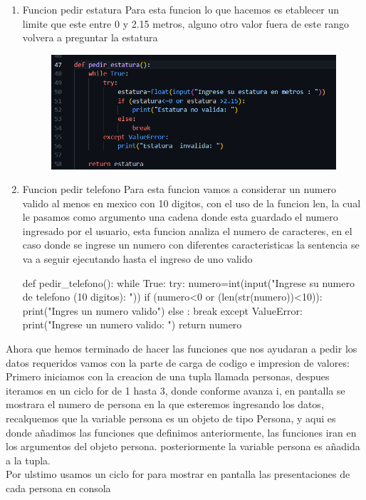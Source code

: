 \documentclass[12pt]{article}
\begin{document}
\begin{enumerate}
\item{Funcion pedir estatura} Para esta funcion lo que hacemos es etablecer un limite que este entre 0 y 2.15 metros, alguno otro valor fuera de este rango volvera a preguntar la estatura

\begin{figure}[H]
		\begin{center}
 			\includegraphics[width = .8\textwidth]{04.png}
 			
		\end{center} 
\end{figure}

\item{Funcion pedir telefono}
Para esta funcion vamos a considerar un numero valido al menos en mexico con 10 digitos, con el uso de la funcion len, la cual  le pasamos como argumento una cadena donde esta guardado el numero ingresado por el usuario, esta funcion analiza el numero de caracteres, en el caso donde se ingrese un numero con diferentes caracteristicas la sentencia se va a seguir ejecutando hasta el ingreso de uno valido


\begin{python}[caption=Funcion para pedir un numero de telefono ,label=python_example]
def pedir_telefono():
    while True:
        try:
            numero=int(input("Ingrese su numero de telefono (10 digitos): \n"))
            if (numero<0 or (len(str(numero))<10)):
                print("Ingres un numero valido")
            else :
                break
        except ValueError:
            print("Ingrese un numero valido: ")
    return numero

\end{python}



\end{enumerate}

Ahora que hemos terminado de hacer las funciones que nos ayudaran a 
pedir los datos requeridos vamos con la parte de carga de codigo e impresion de valores: \\
Primero iniciamos con la creacion de una tupla llamada personas, despues iteramos en un ciclo for de 1 hasta 3, donde conforme avanza i, en pantalla se mostrara el numero de persona en la que esteremos ingresando los datos, recalquemos que la variable persona es un objeto de tipo Persona, y aqui es donde añadimos las funciones que definimos anteriormente, las funciones iran en los argumentos del objeto persona. posteriormente la variable persona es añadida a la tupla.\\
Por ulstimo usamos un ciclo for para mostrar en pantalla las presentaciones de cada persona en consola
\end{document}
